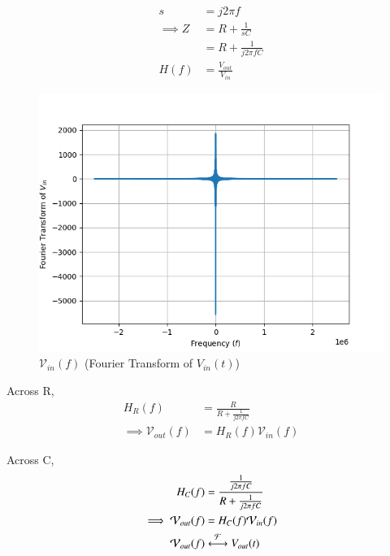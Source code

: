 \documentclass[journal,12pt,twocolumn]{IEEEtran}
\theoremstyle{remark}
\begin{document}

\begin{align}
    s &= j2\pi f\\
    \implies Z &= R + \frac{1}{sC}\\
    &= R + \frac{1}{j2\pi f C}\\
    H(f) &= \frac{V_{out}}{V_{in}}
\end{align}


\begin{figure}[!h]
    \centering
    \includegraphics[width = \columnwidth]{figs/square_fourier.png}
    \caption{$\mathcal{V}_{in}(f)$ (Fourier Transform of $V_{in}(t)$)}
    \label{fig:square_fft_gate.ph.23.37}
\end{figure}
Across R,
\begin{align}
    H_{R}(f) &= \frac{R}{R + \frac{1}{j2\pi f C}}\\
    \implies \mathcal{V}_{out}(f) &= H_{R}(f)\mathcal{V}_{in}(f)
\end{align}

Across C,
\begin{align}
    H_{C}(f) &= \frac{\frac{1}{j2\pi f C}}{R + \frac{1}{j2\pi f C}}\\
    \implies \mathcal{V}_{out}(f) &= H_{C}(f)\mathcal{V}_{in}(f)\\
    \mathcal{V}_{out}(f) &\system{F} V_{out}(t)
\end{align}
\end{document}
